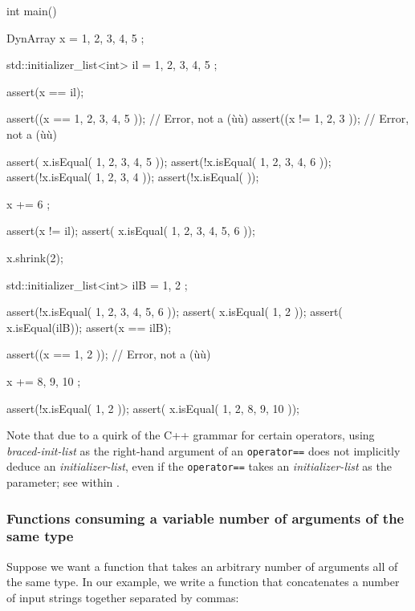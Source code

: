 \begin{emcppslisting}
int main()
{
    DynArray x = { 1, 2, 3, 4, 5 };

    std::initializer_list<int> il = { 1, 2, 3, 4, 5 };

    assert(x == il);

    assert((x == { 1, 2, 3, 4, 5 }));  // Error, not a (ù{}ù)
    assert((x != { 1, 2, 3 }));        // Error, not a (ù{}ù)

    assert( x.isEqual({ 1, 2, 3, 4, 5 }));
    assert(!x.isEqual({ 1, 2, 3, 4, 6 }));
    assert(!x.isEqual({ 1, 2, 3, 4 }));
    assert(!x.isEqual({ }));

    x += { 6 };

    assert(x != il);
    assert( x.isEqual({ 1, 2, 3, 4, 5, 6 }));

    x.shrink(2);

    std::initializer_list<int> ilB = { 1, 2 };

    assert(!x.isEqual({ 1, 2, 3, 4, 5, 6 }));
    assert( x.isEqual({ 1, 2 }));
    assert( x.isEqual(ilB));
    assert(x == ilB);

    assert((x == { 1, 2 }));  // Error, not a (ù{}ù)

    x += { 8, 9, 10 };

    assert(!x.isEqual({ 1, 2 }));
    assert( x.isEqual({ 1, 2, 8, 9, 10 }));}
\end{emcppslisting}
    

\noindent Note that due to a quirk of the C++ grammar for certain operators, using
\emph{braced-init-list} as the right-hand argument of an
\lstinline!operator==! does not implicitly deduce an
\emph{initializer-list}, even if the \lstinline!operator==! takes an
\emph{initializer-list} as the parameter; see  within .

\subsubsection[Functions consuming a variable number of arguments of the same type]{Functions consuming a variable number of arguments of the same type}\label{functions-consuming-a-variable-number-of-arguments-of-the-same-type}

Suppose we want a function that takes an arbitrary number of arguments
all of the same type. In our example, we write a function that
concatenates a number of input strings together separated by commas:

